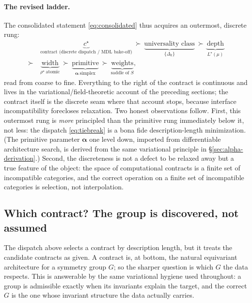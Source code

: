 \documentclass[11pt]{article}
\theoremstyle{definition}
\newcommand{\rhostar}{\rho^{\star}}
\newcommand{\Lstar}{L^{\star}}
\newcommand{\alphapar}{\bm{\alpha}}
\begin{document}
\paragraph{The revised ladder.} The consolidated statement \eqref{eq:consolidated} thus acquires an
outermost, discrete rung:
\begin{equation}
\begin{aligned}
&\underbrace{c^\star}_{\text{contract (discrete dispatch / MDL bake-off)}}
\ \succ\
\underbrace{\text{universality class}}_{\{\Delta_k\}}
\ \succ\
\underbrace{\text{depth}}_{\Lstar(\mu)}\\[2pt]
\succ\ &
\underbrace{\text{width}}_{\rhostar\ \text{atomic}}
\ \succ\
\underbrace{\text{primitive}}_{\alphapar\ \text{simplex}}
\ \succ\
\underbrace{\text{weights}}_{\text{saddle of }S},
\end{aligned}
\end{equation}
read from coarse to fine. Everything to the right of the contract is continuous and lives in the
variational/field-theoretic account of the preceding sections; the contract itself is the discrete
seam where that account stops, because interface incompatibility forecloses relaxation. Two honest
observations follow. First, this outermost rung is \emph{more} principled than the primitive rung
immediately below it, not less: the dispatch \eqref{eq:tiebreak} is a bona fide description-length
minimization. (The primitive parameter $\alphapar$ one level down, imported from differentiable
architecture search, is derived from the same variational principle in \S\ref{sec:alpha-derivation}.)
Second, the discreteness is not a defect to be
relaxed away but a true feature of the object: the space of computational contracts is a finite set of
incompatible categories, and the correct operation on a finite set of incompatible categories is
selection, not interpolation.



\subsection{Which contract? The group is discovered, not assumed}
\label{sec:groupdiscovery}

The dispatch above selects a contract by description length, but it treats the candidate contracts as
given. A contract is, at bottom, the natural equivariant architecture for a symmetry group $G$; so the
sharper question is which $G$ the data respects. This is answerable by the same variational hygiene
used throughout: a group is admissible exactly when its invariants explain the target, and the correct
$G$ is the one whose invariant structure the data actually carries.
\end{document}
